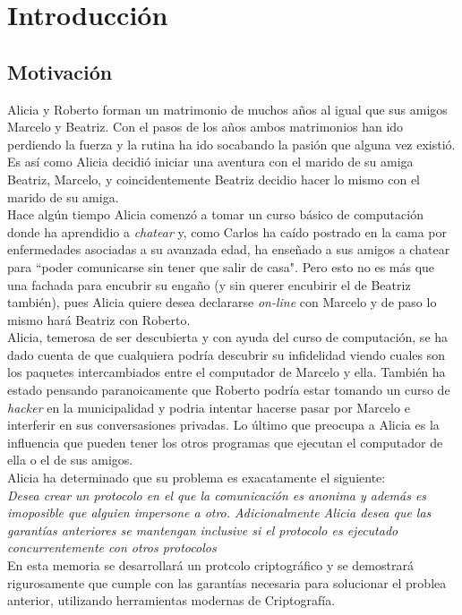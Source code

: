 \chapter{Introducción}

\section{Motivación}

Alicia y Roberto forman un matrimonio de muchos años
al igual que sus amigos Marcelo y Beatriz. Con el pasos de los años
ambos matrimonios han ido perdiendo la fuerza y la rutina ha ido socabando
la pasión que alguna vez existió. Es así como Alicia decidió iniciar una
aventura con el marido de su amiga Beatriz, Marcelo, y coincidentemente
Beatriz decidio hacer lo mismo con el marido de su amiga.\\
Hace algún tiempo Alicia comenzó a tomar un curso básico de computación donde
ha aprendidio a \textit{chatear} y, como Carlos ha caído postrado en la cama por
enfermedades asociadas a su avanzada edad, ha enseñado a sus amigos a chatear para
``poder comunicarse sin tener que salir de casa". Pero esto no es más que una fachada
para encubrir su engaño (y sin querer encubirir el de Beatriz también), pues Alicia
quiere desea declararse \textit{on-line} con Marcelo y de paso lo mismo hará Beatriz
con Roberto.\\
Alicia, temerosa de ser descubierta y con ayuda del curso de computación, se ha dado
cuenta de que cualquiera podría descubrir su infidelidad viendo cuales son los paquetes
intercambiados entre el computador de Marcelo y ella. También ha estado pensando paranoicamente
que Roberto podría estar tomando un curso de \textit{hacker} en la municipalidad y podria
intentar hacerse pasar por Marcelo e interferir en sus conversasiones privadas. Lo último que
preocupa a Alicia es la influencia que pueden tener los otros programas que ejecutan el computador
de ella o el de sus amigos.\\
Alicia ha determinado que su problema es exacatamente el siguiente:\\
\textit{Desea crear un protocolo  en el que la comunicación es anonima y
además es imoposible que alguien impersone a otro. Adicionalmente Alicia desea que las garantías
anteriores se mantengan inclusive si el protocolo es ejecutado concurrentemente con otros protocolos}\\ 
En esta memoria se desarrollará un protcolo criptográfico y se demostrará rigurosamente que cumple con
las garantías necesaria para solucionar el problea anterior, utilizando herramientas modernas de Criptografía. 

